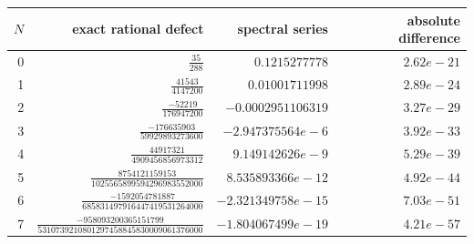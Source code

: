 \begin{tabular}{@{}rrrr@{}}
\toprule
$N$ & exact rational defect & spectral series & absolute difference\\
\midrule
0 & $\frac{35}{288}$ & $0.1215277778$ & $2.62e-21$\\
1 & $\frac{41543}{4147200}$ & $0.01001711998$ & $2.89e-24$\\
2 & $\frac{-52219}{176947200}$ & $-0.0002951106319$ & $3.27e-29$\\
3 & $\frac{-176635903}{59929893273600}$ & $-2.947375564e-6$ & $3.92e-33$\\
4 & $\frac{44917321}{4909456856973312}$ & $9.149142626e-9$ & $5.29e-39$\\
5 & $\frac{8754121159153}{1025565899594296983552000}$ & $8.535893366e-12$ & $4.92e-44$\\
6 & $\frac{-1592054781887}{685831497916447419531264000}$ & $-2.321349758e-15$ & $7.03e-51$\\
7 & $\frac{-958093200365151799}{5310739210801297458845830009061376000}$ & $-1.804067499e-19$ & $4.21e-57$\\
\bottomrule
\end{tabular}
